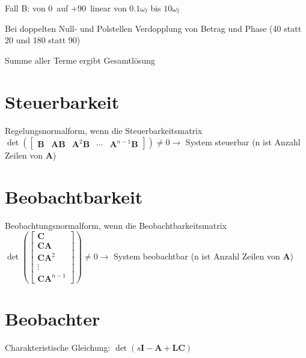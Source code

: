 \documentclass[11pt,a4paper,fleqn,headsepline]{scrreprt}
\begin{document}
\begin{multicols}{2}
        Fall B: von 0\degree\ auf +90\degree\ linear von \(0.1\omega_l\) bis \(10\omega_l\)

        Bei doppelten Null- und Polstellen Verdopplung von Betrag und Phase (40 statt 20 und 180 statt 90)

        Summe aller Terme ergibt Gesamtlösung

        \section*{Steuerbarkeit}

        Regelungsnormalform, wenn die Steuerbarkeitsmatrix \(\det(\begin{bmatrix}
        \mathbf{B} & \mathbf{A} \mathbf{B} & \mathbf{A}^2 \mathbf{B} & \cdots & \mathbf{A}^{n-1} \mathbf{B}\end{bmatrix}) \ne 0 \to\) System steuerbar (n ist Anzahl Zeilen von \(\mathbf{A}\))

        \section*{Beobachtbarkeit}

        Beobachtungsnormalform, wenn die Beobachtbarkeitsmatrix \(\det\left(\begin{bmatrix}
        \mathbf{C} \\ \mathbf{C}\mathbf{A} \\ \mathbf{C}\mathbf{A}^2 \\ \vdots \\ \mathbf{C}\mathbf{A}^{n-1} \end{bmatrix}\right) \ne 0 \to\) System beobachtbar (n ist Anzahl Zeilen von \(\mathbf{A}\))

        \section*{Beobachter}

        Charakteristische Gleichung: \(\det(s\mathbf{I} - \mathbf{A} + \mathbf{L} \mathbf{C} )\)

    \end{multicols}
 
\end{document}

